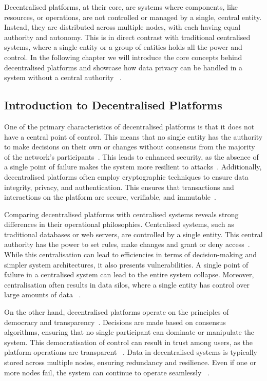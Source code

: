 Decentralised platforms, at their core, are systems where components, like resources, or operations, are not controlled or managed by a single, central entity. Instead, they are distributed across multiple nodes, with each having equal authority and autonomy. This is in direct contrast with traditional centralised systems, where a single entity or a group of entities holds all the power and control. In the following chapter we will introduce the core concepts behind decentralised platforms and showcase how data privacy can be handled in a system without a central authority ~\cite{Tverdokhlib.2022}.


\subsection{Introduction to Decentralised Platforms}

One of the primary characteristics of decentralised platforms is that it does not have a central point of control. This means that no single entity has the authority to make decisions on their own or changes without consensus from the majority of the network's participants~\cite{SEFRAOUI.2022}. This leads to enhanced security, as the absence of a single point of failure makes the system more resilient to attacks~\cite{Maffiola.2022}. Additionally, decentralised platforms often employ cryptographic techniques to ensure data integrity, privacy, and authentication. This ensures that transactions and interactions on the platform are secure, verifiable, and immutable~\cite{SEFRAOUI.2022}.

Comparing decentralised platforms with centralised systems reveals strong differences in their operational philosophies. Centralised systems, such as traditional databases or web servers, are controlled by a single entity. This central authority has the power to set rules, make changes and grant or deny access~\cite{Maffiola.2022}. While this centralisation can lead to efficiencies in terms of decision-making and simpler system architectures, it also presents vulnerabilities. A single point of failure in a centralised system can lead to the entire system collapse. Moreover, centralisation often results in data silos, where a single entity has control over large amounts of data ~\cite{Maffiola.2022}.

On the other hand, decentralised platforms operate on the principles of democracy and transparency~\cite{SEFRAOUI.2022}. Decisions are made based on consensus algorithms, ensuring that no single participant can dominate or manipulate the system. This democratisation of control can result in trust among users, as the platform operations are transparent ~\cite{Hasan.2022}. Data in decentralised systems is typically stored across multiple nodes, ensuring redundancy and resilience. Even if one or more nodes fail, the system can continue to operate seamlessly ~\cite{Hasan.2022}.

